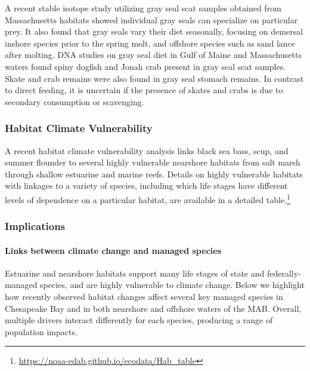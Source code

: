 \documentclass[
  10pt,
]{article}
\begin{document}
A recent stable isotope study utilizing gray seal scat samples obtained
from Massachusetts habitats showed individual gray seals can specialize
on particular prey. It also found that gray seals vary their diet
seasonally, focusing on demersal inshore species prior to the spring
molt, and offshore species such as sand lance after molting. DNA studies
on gray seal diet in Gulf of Maine and Massachusetts waters found spiny
dogfish and Jonah crab present in gray seal scat samples. Skate and crab
remains were also found in gray seal stomach remains. In contrast to
direct feeding, it is uncertain if the presence of skates and crabs is
due to secondary consumption or scavenging.

\hypertarget{habitat-climate-vulnerability}{%
\subsubsection{Habitat Climate
Vulnerability}\label{habitat-climate-vulnerability}}

A recent habitat climate vulnerability analysis links black sea bass,
scup, and summer flounder to several highly vulnerable nearshore
habitats from salt marsh through shallow estuarine and marine reefs.
Details on highly vulnerable habitats with linkages to a variety of
species, including which life stages have different levels of dependence
on a particular habitat, are available in a detailed table.\footnote{\url{https://noaa-edab.github.io/ecodata/Hab_table}}

\hypertarget{implications-6}{%
\subsubsection{Implications}\label{implications-6}}

\hypertarget{links-between-climate-change-and-managed-species}{%
\paragraph{Links between climate change and managed
species}\label{links-between-climate-change-and-managed-species}}

Estuarine and nearshore habitats support many life stages of state and
federally-managed species, and are highly vulnerable to climate change.
Below we highlight how recently observed habitat changes affect several
key managed species in Chesapeake Bay and in both nearshore and offshore
waters of the MAB. Overall, multiple drivers interact differently for
each species, producing a range of population impacts.
\end{document}
